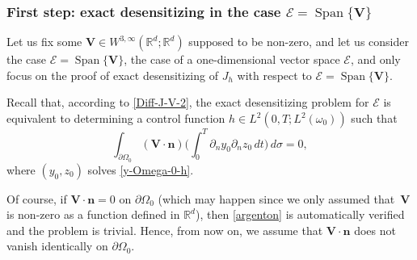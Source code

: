 \documentclass[JEP,XML,SOM,Unicode,NoFloatCountersInSection]{cedram}
\newcommand{\bn}{\boldsymbol{n}}
\newcommand{\bV}{\boldsymbol{V}}
\DeclareMathOperator{\Span}{Span}
\theoremstyle{definition}
\begin{document}
\subsubsection*{First step: exact desensitizing in the case $\mathcal{E}=\Span \{\bV\}$}
Let us fix some $\bV\in W^{3,\infty}(\mathbb R^d;\mathbb R^d)$ supposed to be non-zero, and let us consider the case $\mathcal{E}=\Span \{\bV\}$, \ie the case of a one-dimensional vector space $\mathcal{E}$, and only focus on the proof of exact desensitizing of $J_h$ with respect to $\mathcal{E} = \Span \{\bV\}$.

Recall that, according to \eqref{Diff-J-V-2}, the exact desensitizing problem for $\mathcal{E}$ is equivalent to determining a control function $h \in L^2(0,T; L^2(\omega_0))$ such that
\begin{equation}
\label{argenton}
\int_{\partial\Omega_{0}}(\bV\cdot \bn)
\biggl(\int_{0}^{T}\partial_{n}y_{0}\partial_{n} z_{0}\, dt \biggr)\,
d\sigma
=0,
\end{equation}
where $(y_0,z_0)$ solves \eqref{y-Omega-0-h}.

Of course, if $\bV\cdot \bn=0$ on $\partial\Omega_0$ (which may happen since we only assumed that~$\bV $ is non-zero as a function defined in $\mathbb R^d$), then \eqref{argenton} is automatically verified and the problem is trivial. Hence, from now on, we assume that $\bV\cdot \bn$ does not vanish {identically} on $\partial\Omega_0$.
\end{document}
